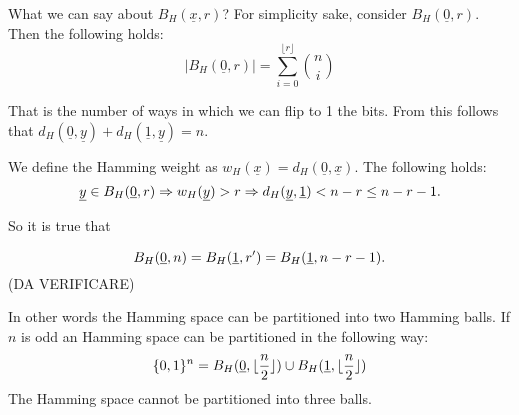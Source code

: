 What we can say about $B_H(\underline{x}, r)$? For simplicity sake, consider $B_H(\underline{0}, r)$. Then the following holds:
\begin{equation}
	|B_H(\underline{0}, r)| = \sum_{i = 0}^{\lfloor r \rfloor} \binom{n}{i}
\end{equation}

That is the number of ways in which we can flip to 1 the bits. From this follows that $d_H(\underline{0}, \underline{y}) + d_H(\underline{1}, \underline{y}) = n$.

We define the Hamming weight as $w_H(\underline{x}) = d_H(\underline{0}, \underline{x})$. The following holds:
$$\underline{y} \in B_H(\underline{0}, r) \Rightarrow w_H(\underline{y}) > r \Rightarrow d_H(\underline{y}, \underline{1}) < n - r \leq n -r - 1.$$

So it is true that

$$B_H(\underline{0}, n) = B_H(\underline{1}, r') = B_H(\underline{1}, n - r - 1).$$ (DA VERIFICARE)

In other words the Hamming space can be partitioned into two Hamming balls. If $n$ is odd an Hamming space can be partitioned in the following way: $$\{0, 1\}^n = B_H(\underline{0}, \lfloor \dfrac{n}{2}\rfloor ) \cup B_H(\underline{1}, \lfloor \dfrac{n}{2}\rfloor)$$
The Hamming space cannot be partitioned into three balls.